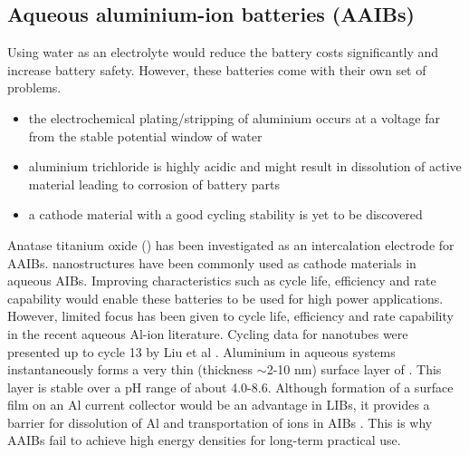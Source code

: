 \subsection{Aqueous aluminium-ion batteries (AAIBs)}
Using water as an electrolyte would reduce the battery costs significantly and increase battery safety. However, these batteries come with their own set of problems. 

\begin{itemize}
    \item the electrochemical plating/stripping of aluminium occurs at a voltage far from the stable potential window of water
    \item aluminium trichloride  is highly acidic and might result in dissolution of active material leading to corrosion of battery parts
    \item a cathode material with a good cycling stability is yet to be discovered
\end{itemize}  

Anatase titanium oxide () has been investigated as an intercalation electrode for AAIBs.  nanostructures have been commonly used as cathode materials in aqueous AIBs. Improving characteristics such as cycle life, efficiency and rate capability would enable these batteries to be used for high power applications. However, limited focus has been given to cycle life, efficiency and rate capability in the recent aqueous Al-ion literature. Cycling data for  nanotubes were presented up to cycle 13 by Liu et al \cite{liu_aluminum_2012}.  %
Aluminium in aqueous systems instantaneously forms a very thin (thickness $\sim$2-10 nm) surface layer of  \cite{vargel_translated_2004}. This layer is stable over a pH range of about 4.0-8.6. Although formation of a surface film on an Al current collector would be an advantage in LIBs, it provides a barrier for dissolution of Al and transportation of  ions in AIBs \cite{myung_electrochemical_2011}. This is why AAIBs fail to achieve high energy densities for long-term practical use.

